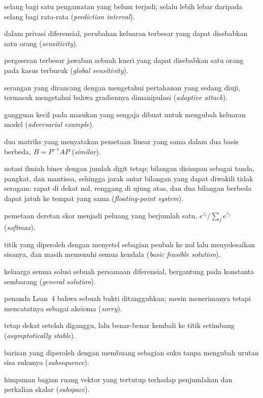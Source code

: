 \documentclass[11pt,a4paper,oneside]{book}
\theoremstyle{definition}
\theoremstyle{plain}
\theoremstyle{remark}
\begin{document}
\begin{description}[style=nextline,itemsep=0.35em]
  \item[Selang prediksi] selang bagi satu pengamatan yang belum terjadi; selalu lebih lebar daripada selang bagi rata-rata (\emph{prediction interval}).
  \item[Sensitivitas] dalam privasi diferensial, perubahan keluaran terbesar yang dapat disebabkan satu orang (\emph{sensitivity}).
  \item[Sensitivitas global] pergeseran terbesar jawaban sebuah kueri yang dapat disebabkan satu orang pada kasus terburuk (\emph{global sensitivity}).
  \item[Serangan adaptif] serangan yang dirancang dengan mengetahui pertahanan yang sedang diuji, termasuk mengetahui bahwa gradiennya dimanipulasi (\emph{adaptive attack}).
  \item[Serangan adversarial] gangguan kecil pada masukan yang sengaja dibuat untuk mengubah keluaran model (\emph{adversarial example}).
  \item[Serupa] dua matriks yang menyatakan pemetaan linear yang sama dalam dua basis berbeda, $B=P^{-1}AP$ (\emph{similar}).
  \item[Sistem floating-point] notasi ilmiah biner dengan jumlah digit tetap; bilangan disimpan sebagai tanda, pangkat, dan mantissa, sehingga jarak antar bilangan yang dapat diwakili tidak seragam: rapat di dekat nol, renggang di ujung atas, dan dua bilangan berbeda dapat jatuh ke tempat yang sama (\emph{floating-point system}).
  \item[Softmax] pemetaan deretan skor menjadi peluang yang berjumlah satu, $e^{z_i}/\sum_j e^{z_j}$ (\emph{softmax}).
  \item[Solusi layak basis] titik yang diperoleh dengan menyetel sebagian peubah ke nol lalu menyelesaikan sisanya, dan masih memenuhi semua kendala (\emph{basic feasible solution}).
  \item[Solusi umum] keluarga semua solusi sebuah persamaan diferensial, bergantung pada konstanta sembarang (\emph{general solution}).
  \item[Sorry] penanda Lean~4 bahwa sebuah bukti ditangguhkan; mesin menerimanya tetapi mencatatnya sebagai aksioma (\emph{sorry}).
  \item[Stabil asimtotik] tetap dekat setelah diganggu, lalu benar-benar kembali ke titik setimbang (\emph{asymptotically stable}).
  \item[Subbarisan] barisan yang diperoleh dengan membuang sebagian suku tanpa mengubah urutan sisa sukunya (\emph{subsequence}).
  \item[Subruang] himpunan bagian ruang vektor yang tertutup terhadap penjumlahan dan perkalian skalar (\emph{subspace}).

\end{description}
\end{document}
